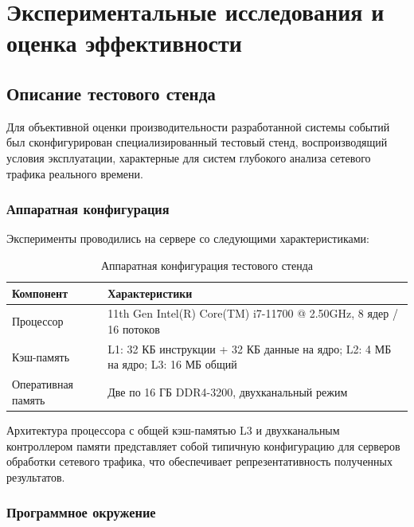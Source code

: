 \section{Экспериментальные исследования и оценка эффективности}

\subsection{Описание тестового стенда}
\label{sec:testbed}

Для объективной оценки производительности разработанной системы событий был сконфигурирован специализированный тестовый стенд, воспроизводящий условия эксплуатации, характерные для систем глубокого анализа сетевого трафика реального времени.

\subsubsection{Аппаратная конфигурация}

Эксперименты проводились на сервере со следующими характеристиками:

\begin{table}[H]
\centering
\caption{Аппаратная конфигурация тестового стенда}
\label{tab:hardware_config}
\begin{tabularx}{\textwidth}{lX}
\toprule
\textbf{Компонент} & \textbf{Характеристики} \\
\midrule
Процессор & 11th Gen Intel(R) Core(TM) i7-11700 @ 2.50GHz, 8 ядер / 16 потоков \\
Кэш-память & L1: 32 КБ инструкции + 32 КБ данные на ядро; L2: 4 МБ на ядро; L3: 16 МБ общий \\
Оперативная память & Две по 16 ГБ DDR4-3200, двухканальный режим \\
\bottomrule
\end{tabularx}
\end{table}

Архитектура процессора с общей кэш-памятью L3 и двухканальным контроллером памяти представляет собой типичную конфигурацию для серверов обработки сетевого трафика, что обеспечивает репрезентативность полученных результатов.

\subsubsection{Программное окружение}

